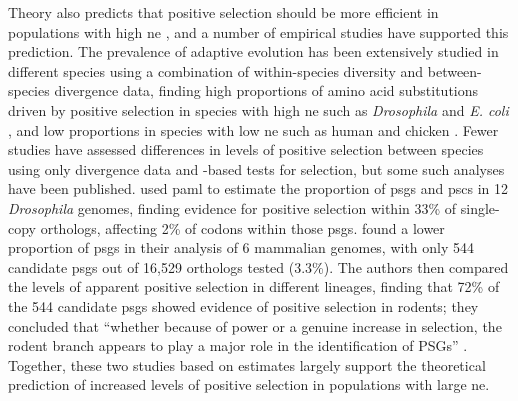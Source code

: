 Theory also predicts that positive selection should be more efficient
in populations with high \ac{ne} \citep{Ellegren2009,Halligan2010},
and a number of empirical studies have supported this prediction. The
prevalence of adaptive evolution has been extensively studied in
different species using a combination of within-species diversity and
between-species divergence data, finding high proportions of amino
acid substitutions driven by positive selection in species with high
\ac{ne} such as \emph{Drosophila} \citep{Bierne2004} and
\emph{E. coli} \citep{Charlesworth2006}, and low proportions in
species with low \ac{ne} such as human
\citep{Zhang2005b,Sequencing2005a,Boyko2008} and chicken
\citep{Axelsson2009}. Fewer studies have assessed differences in
levels of positive selection between species using only divergence
data and \dnds-based tests for selection, but some such analyses have
been published. \citet{Clark2007} used \acs{paml} \citep{Yang2007} to estimate the
proportion of \acp{psg} and \acp{psc} in 12 \emph{Drosophila} genomes,
finding evidence for positive selection within 33\% of single-copy
orthologs, affecting 2\% of codons within those
\acp{psg}. \citet{Kosiol2008} found a lower proportion of \acp{psg} in
their analysis of 6 mammalian genomes, with only 544 candidate
\acp{psg} out of 16,529 orthologs tested (3.3\%). The authors then
compared the levels of apparent positive selection in different
lineages, finding that 72\% of the 544 candidate \acp{psg} showed
evidence of positive selection in rodents; they concluded that
``whether because of power or a genuine increase in selection, the
rodent branch appears to play a major role in the identification of
PSGs'' \citep{Kosiol2008}. Together, these two studies based on \dnds
estimates largely support the theoretical prediction of increased
levels of positive selection in populations with large \ac{ne}.

